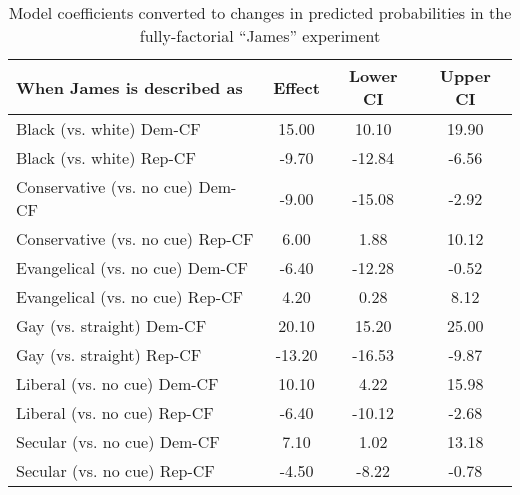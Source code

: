 \begin{table}[!htb]
\centering
\caption{Model coefficients converted to changes in predicted probabilities in the fully-factorial ``James'' experiment} 
\label{tab:tab:logit_james_pp}
\begingroup\small
\begin{tabular}{lccc}
  \hline
When James is described as & Effect & Lower CI & Upper CI \\ 
  \hline
Black (vs. white) Dem-CF & 15.00 & 10.10 & 19.90 \\ 
  Black (vs. white) Rep-CF & -9.70 & -12.84 & -6.56 \\ 
  Conservative (vs. no cue) Dem-CF & -9.00 & -15.08 & -2.92 \\ 
  Conservative (vs. no cue) Rep-CF & 6.00 & 1.88 & 10.12 \\ 
  Evangelical (vs. no cue) Dem-CF & -6.40 & -12.28 & -0.52 \\ 
  Evangelical (vs. no cue) Rep-CF & 4.20 & 0.28 & 8.12 \\ 
  Gay (vs. straight) Dem-CF & 20.10 & 15.20 & 25.00 \\ 
  Gay (vs. straight) Rep-CF & -13.20 & -16.53 & -9.87 \\ 
  Liberal (vs. no cue) Dem-CF & 10.10 & 4.22 & 15.98 \\ 
  Liberal (vs. no cue) Rep-CF & -6.40 & -10.12 & -2.68 \\ 
  Secular (vs. no cue) Dem-CF & 7.10 & 1.02 & 13.18 \\ 
  Secular (vs. no cue) Rep-CF & -4.50 & -8.22 & -0.78 \\ 
   \hline
\end{tabular}
\endgroup
\end{table}
